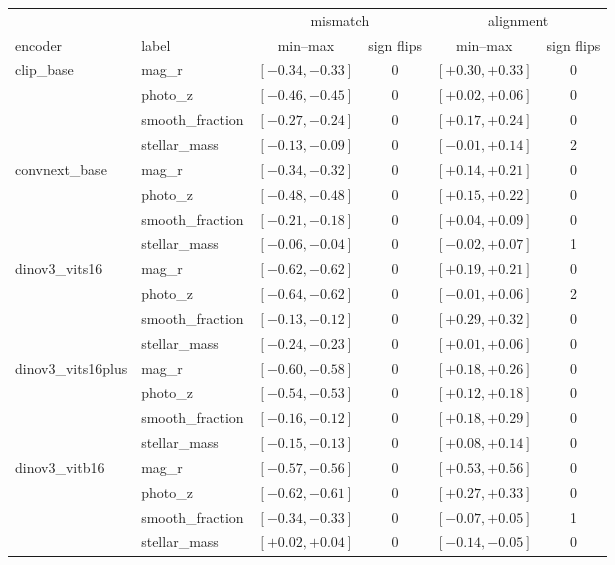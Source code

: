 \begin{table}[h]
\centering\footnotesize\setlength{\tabcolsep}{3.5pt}
\begin{tabular}{llcccc}
\toprule
 & & \multicolumn{2}{c}{mismatch} & \multicolumn{2}{c}{alignment} \\
encoder & label & min--max & sign flips & min--max & sign flips \\
\midrule
clip\_base & mag\_r & $[-0.34, -0.33]$ & 0 & $[+0.30, +0.33]$ & 0 \\
 & photo\_z & $[-0.46, -0.45]$ & 0 & $[+0.02, +0.06]$ & 0 \\
 & smooth\_fraction & $[-0.27, -0.24]$ & 0 & $[+0.17, +0.24]$ & 0 \\
 & stellar\_mass & $[-0.13, -0.09]$ & 0 & $[-0.01, +0.14]$ & 2 \\
\addlinespace[2pt]
convnext\_base & mag\_r & $[-0.34, -0.32]$ & 0 & $[+0.14, +0.21]$ & 0 \\
 & photo\_z & $[-0.48, -0.48]$ & 0 & $[+0.15, +0.22]$ & 0 \\
 & smooth\_fraction & $[-0.21, -0.18]$ & 0 & $[+0.04, +0.09]$ & 0 \\
 & stellar\_mass & $[-0.06, -0.04]$ & 0 & $[-0.02, +0.07]$ & 1 \\
\addlinespace[2pt]
dinov3\_vits16 & mag\_r & $[-0.62, -0.62]$ & 0 & $[+0.19, +0.21]$ & 0 \\
 & photo\_z & $[-0.64, -0.62]$ & 0 & $[-0.01, +0.06]$ & 2 \\
 & smooth\_fraction & $[-0.13, -0.12]$ & 0 & $[+0.29, +0.32]$ & 0 \\
 & stellar\_mass & $[-0.24, -0.23]$ & 0 & $[+0.01, +0.06]$ & 0 \\
\addlinespace[2pt]
dinov3\_vits16plus & mag\_r & $[-0.60, -0.58]$ & 0 & $[+0.18, +0.26]$ & 0 \\
 & photo\_z & $[-0.54, -0.53]$ & 0 & $[+0.12, +0.18]$ & 0 \\
 & smooth\_fraction & $[-0.16, -0.12]$ & 0 & $[+0.18, +0.29]$ & 0 \\
 & stellar\_mass & $[-0.15, -0.13]$ & 0 & $[+0.08, +0.14]$ & 0 \\
\addlinespace[2pt]
dinov3\_vitb16 & mag\_r & $[-0.57, -0.56]$ & 0 & $[+0.53, +0.56]$ & 0 \\
 & photo\_z & $[-0.62, -0.61]$ & 0 & $[+0.27, +0.33]$ & 0 \\
 & smooth\_fraction & $[-0.34, -0.33]$ & 0 & $[-0.07, +0.05]$ & 1 \\
 & stellar\_mass & $[+0.02, +0.04]$ & 0 & $[-0.14, -0.05]$ & 0 \\

\end{tabular}
\end{table}
